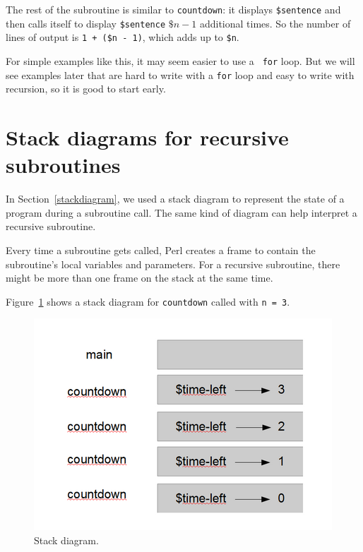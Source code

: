 
The rest of the subroutine is similar to {\tt countdown}: it 
displays {\tt \$sentence} and then calls itself to display 
{\tt \$sentence} $\$n - 1$ additional times.  So the number 
of lines of output is {\tt 1 + (\$n - 1)}, which
adds up to {\tt \$n}.

For simple examples like this, it may seem easier to use a {\tt
for} loop.  But we will see examples later that are hard to write
with a {\tt for} loop and easy to write with recursion, so it is
good to start early.


\section{Stack diagrams for recursive subroutines}
\label{recursive.stack}

In Section~\ref{stackdiagram}, we used a stack diagram to represent
the state of a program during a subroutine call.  The same kind of
diagram can help interpret a recursive subroutine.

Every time a subroutine gets called, Perl creates a
frame to contain the subroutine's local variables and parameters.
For a recursive subroutine, there might be more than one frame 
on the stack at the same time.

Figure~\ref{fig.stack2} shows a stack diagram for {\tt countdown} called with
{\tt n = 3}.

\begin{figure}
\centerline
{\includegraphics[scale=0.6]{figs/stack2.png}}
\caption{Stack diagram.}
\label{fig.stack2}
\end{figure}


